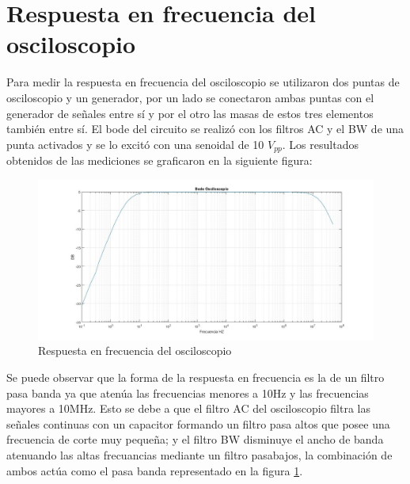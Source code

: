 \section{Respuesta en frecuencia del osciloscopio}

Para medir la respuesta en frecuencia del osciloscopio se utilizaron
dos puntas de osciloscopio y un generador, por un lado se conectaron
ambas puntas con el generador de señales entre sí y por el otro las
masas de estos tres elementos también entre sí. El bode del circuito
se realizó con los filtros AC y el BW de una punta activados y
se lo excitó con una senoidal de 10 $V_{pp}$. Los resultados obtenidos
de las mediciones se graficaron en la siguiente figura:
\begin{figure}[H]
\centering{}\includegraphics[scale=0.4]{./BodeModuloOsciloscopio.jpg}\caption{Respuesta en frecuencia del osciloscopio}
\label{fig:rtaosc}
\end{figure}

Se puede observar que la forma de la respuesta en frecuencia es la
de un filtro pasa banda ya que atenúa las frecuencias menores a 10Hz
y las frecuencias mayores a 10MHz. Esto se debe a que el filtro AC
del osciloscopio filtra las señales continuas con un capacitor formando
un filtro pasa altos que posee una frecuencia de corte muy pequeña; y el
filtro BW disminuye el ancho de banda atenuando las altas frecuancias
mediante un filtro pasabajos, la combinación de ambos actúa como
el pasa banda representado en la figura \ref{fig:rtaosc}.

